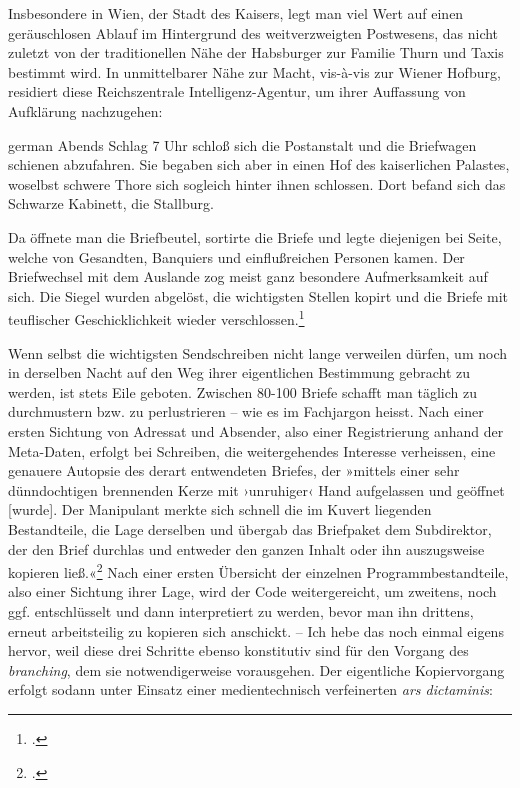 \documentclass[a4paper,12pt]{article}
\newcommand{\anf}[1]{»#1«}
\newenvironment{zitat}{
\begin{foreigndisplayquote}{german}}%
{\end{foreigndisplayquote}}
\begin{document}
Insbesondere in Wien, der Stadt des Kaisers, legt man viel Wert auf einen geräuschlosen Ablauf im Hintergrund des weitverzweigten Postwesens, das nicht zuletzt von der traditionellen Nähe der Habsburger zur Familie Thurn und Taxis bestimmt wird. In unmittelbarer Nähe zur Macht, vis-à-vis zur Wiener Hofburg, residiert diese Reichszentrale Intelligenz-Agentur, um ihrer Auffassung von Aufklärung nachzugehen:
\begin{zitat}
Abends Schlag 7 Uhr schloß sich die Postanstalt und die Briefwagen schienen abzufahren. Sie begaben sich aber in einen Hof des kaiserlichen Palastes, woselbst schwere Thore sich sogleich hinter ihnen schlossen. Dort befand sich das Schwarze Kabinett, die Stallburg.

Da öffnete man die Briefbeutel, sortirte die Briefe und legte diejenigen bei Seite, welche von Gesandten, Banquiers und einflußreichen Personen kamen. Der Briefwechsel mit dem Auslande zog meist ganz besondere Aufmerksamkeit auf sich. Die Siegel wurden abgelöst, die wichtigsten Stellen kopirt und die Briefe mit teuflischer Geschicklichkeit wieder verschlossen.\footcite[40]{koenig:1875}
\end{zitat}
Wenn selbst die wichtigsten Sendschreiben nicht lange verweilen dürfen, um noch in derselben Nacht auf den Weg ihrer eigentlichen Bestimmung gebracht zu werden, ist stets Eile geboten. Zwischen 80-100 Briefe schafft man täglich zu durchmustern bzw. zu perlustrieren – wie es im Fachjargon heisst. Nach einer ersten Sichtung von Adressat und Absender, also einer Registrierung anhand der Meta-Daten, erfolgt bei Schreiben, die weitergehendes Interesse verheissen, eine genauere Autopsie des derart entwendeten Briefes, der \anf{mittels einer sehr dünndochtigen brennenden Kerze mit ›unruhiger‹ Hand aufgelassen und geöffnet [wurde]. Der Manipulant merkte sich schnell die im Kuvert liegenden Bestandteile, die Lage derselben und übergab das Briefpaket dem Subdirektor, der den Brief durchlas und entweder den ganzen Inhalt oder ihn auszugsweise kopieren ließ.}\footcite[138]{stix:1937} Nach einer ersten Übersicht der einzelnen Programmbestandteile, also einer Sichtung ihrer Lage, wird der Code weitergereicht, um zweitens, noch ggf. entschlüsselt und dann interpretiert zu werden, bevor man ihn drittens, erneut arbeitsteilig zu kopieren sich anschickt. – Ich hebe das noch einmal eigens hervor, weil diese drei Schritte ebenso konstitutiv sind für den Vorgang des \emph{branching}, dem sie notwendigerweise vorausgehen. Der eigentliche Kopiervorgang erfolgt sodann unter Einsatz einer medientechnisch verfeinerten \emph{ars dictaminis}: 
\end{document}
